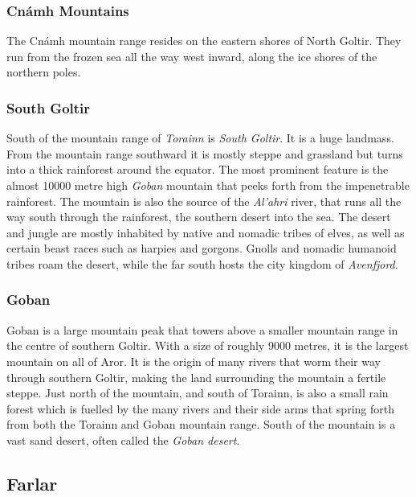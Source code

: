 \subsubsection{Cnámh Mountains}
\label{sec:Cnamh Mountains}

The Cnámh mountain range resides on the eastern shores of North Goltir. They
run from the frozen sea all the way west inward, along the ice shores of the
northern poles.

\subsubsection{South Goltir}
\label{sec:South Goltir}

South of the mountain range of \emph{Torainn} is \emph{South Goltir}. It is
a huge landmass. From the mountain range southward it is mostly steppe and
grassland but turns into a thick rainforest around the equator. The most
prominent feature is the almost 10000 metre high \emph{Goban} mountain that
peeks forth from the impenetrable rainforest. The mountain is also the source
of the \emph{Al'ahri} river, that runs all the way south through the
rainforest, the southern desert into the sea. The desert and jungle are mostly
inhabited by native and nomadic tribes of elves, as well as certain beast
races such as harpies and gorgons. Gnolls and nomadic humanoid tribes roam the
desert, while the far south hosts the city kingdom of \emph{Avenfjord}.

\subsubsection{Goban}
\label{sec:Goban}

Goban is a large mountain peak that towers above a smaller mountain range in
the centre of southern Goltir. With a size of roughly 9000 metres, it is the
largest mountain on all of Aror. It is the origin of many rivers that worm
their way through southern Goltir, making the land surrounding the mountain a
fertile steppe. Just north of the mountain, and south of Torainn, is also a
small rain forest which is fuelled by the many rivers and their side arms
that spring forth from both the Torainn and Goban mountain range. South of the
mountain is a vast sand desert, often called the \emph{Goban desert}.

\subsection{Farlar}
\label{sec:Farlar}

